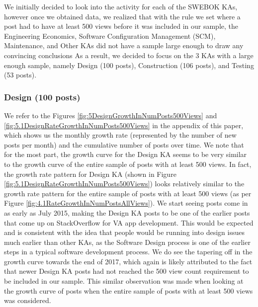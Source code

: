 \documentclass{sigchi}
\begin{document}
We initially decided to look into the activity for each of the SWEBOK KAs, however once we obtained data, we realized that with the rule we set where a post had to have at least 500 views before it was included in our sample, the Engineering Economics, Software Configuration Management (SCM), Maintenance, and Other KAs did not have a sample large enough to draw any convincing conclusions %
As a result, we decided to focus on the 3 KAs with a large enough sample, namely Design (100 posts), Construction (106 posts), and Testing (53 posts).

\subsubsection{Design (100 posts)}
We refer to the Figures \ref{fig:5DesignGrowthInNumPosts500Views} and \ref{fig:5.1DesignRateGrowthInNumPosts500Views} in the appendix of this paper, which shows us the monthly growth rate (represented by the number of new posts per month) and the cumulative number of posts over time. We note that for the most part, the growth curve for the Design KA seems to be very similar to the growth curve of the entire sample of posts with at least 500 views. In fact, the growth rate pattern for Design KA (shown in Figure \ref{fig:5.1DesignRateGrowthInNumPosts500Views}) looks relatively similar to the growth rate pattern for the entire sample of posts with at least 500 views (as per Figure \ref{fig:4.1RateGrowthInNumPostsAllViews}). We start seeing posts come in as early as July 2015, making the Design KA posts to be one of the earlier posts that come up on StackOverflow for VA app development. This would be expected and is consistent with the idea that people would be running into design issues much earlier than other KAs, as the Software Design process is one of the earlier steps in a typical software development process. We do see the tapering off in the growth curve towards the end of 2017, which again is likely attributed to the fact that newer Design KA posts had not reached the 500 view count requirement to be included in our sample. This similar observation was made when looking at the growth curve of posts when the entire sample of posts with at least 500 views was considered.
\end{document}
